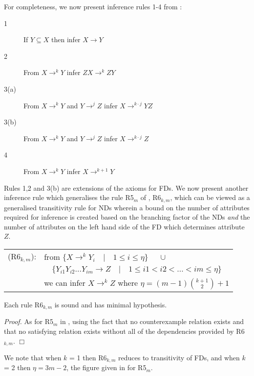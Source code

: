 For completeness, we now present inference rules 1-4 from \cite{gm85a}:
\begin{description}
\item[1] If $Y \subseteq X$ then infer $X \to Y$
\item[2] From $X \to^k Y$ infer $ZX \to^k ZY$
\item[3(a)] From $X \to^k Y$ and $Y \to^j Z$ infer $X \to^{k \cdot j} YZ$
\item[3(b)] From $X \to^k Y$ and $Y \to^j Z$ infer $X \to^{k \cdot j} Z$
\item[4] From $X \to^k Y$ infer $X \to^{k + 1} Y$
\end{description}

Rules 1,2 and 3(b) are extensions of the axioms for FDs.
We now present another inference rule which generalises the rule
R5$_m$ of \cite{gm85b}, R6$_{k,m}$, which can be viewed as a generalised
transitivity rule for NDs wherein a bound on the number of attributes
required for inference is created based on the branching factor of the
NDs {\em and} the number of attributes on the left hand side of the FD
which determines attribute $Z$.

\smallskip
{\line
\begin{table}[ht]
\begin{tabular}{cl} \\
(R6$_{k,m}$): 	& from  $\{ X \to^{k} Y_i \quad |  \quad 1 \le i \le
		\eta \}$    $\quad \cup$ \\
		&    $\quad \{ Y_{i1}Y_{i2} \ldots Y_{im} \to Z
		\quad |  \quad 1 \le i1 < i2 < \ldots < im \le \eta \}$ \\ 
\rule{0cm}{5mm} & we can infer $X \to^{k} Z$ where $\eta =
		(m-1){k+1 \choose 2} + 1$  \\
\end{tabular}
\end{table}}
\smallskip

\begin{theorem}\label{th:1}
\begin{rm}
Each rule R6$_{k,m}$ is sound and has minimal hypothesis.
\end{rm}
\end{theorem}

{\em Proof.} As for R5$_m$ in \cite{gm85b}, using the fact that no
counterexample relation exists and that no satisfying relation exists
without all of the dependencies provided by R6$_{k,m}$. $\Box$

\smallskip

We note that when $k$ = 1 then R6$_{k,m}$ reduces to transitivity of FDs,
and when $k$ = 2 then $\eta = 3m - 2$, the figure given in
\cite{gm85b} for R5$_m$. 



